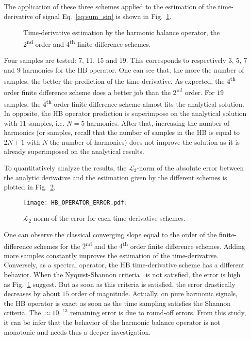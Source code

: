 The application of these three schemes applied 
to the estimation of the time-derivative of signal Eq.~\eqref{eq:sum_sin}
is shown
in Fig.~\ref{fig:hb_operator_sample}.
\begin{figure}[htbp]
  \centering
  \caption{Time-derivative estimation by the harmonic balance operator,
  the 2\textsuperscript{nd} order and 4\textsuperscript{th} finite difference schemes.}
  \label{fig:hb_operator_sample}
\end{figure}
Four samples
are tested: $7$, $11$, $15$ and $19$. This corresponds
to respectively $3$, $5$, $7$ and $9$ harmonics
for the HB operator. One can see that, the more the number
of samples, the better the prediction of the time-derivative.
As expected, the 4\textsuperscript{th} order finite difference
scheme does a better job than the 2\textsuperscript{nd} order.
For $19$ samples, the 4\textsuperscript{th} order finite difference
scheme almost fits the analytical solution. In opposite,
the HB operator prediction is superimpose on the analytical solution
with $11$ samples, i.e. $N=5$ harmonics. After that, increasing the
number of harmonics (or samples, recall that the number of samples
in the HB is equal to $2N+1$ with $N$ the number of harmonics)
does not improve the solution as it is already superimposed on
the analytical results.

To quantitatively analyze the results, the 
$\mathcal{L}_2$-norm of the absolute error between the analytic
derivative and the estimation given by the different schemes
is plotted in Fig.~\ref{fig:hb_operator_error}.
\begin{figure}[htb]
  \centering
   \texttt{[image: HB\_OPERATOR\_ERROR.pdf]}
   \caption{$\mathcal{L}_2$-norm of the error for each time-derivative
   schemes.}
  \label{fig:hb_operator_error}
\end{figure}
One can observe the classical converging slope
equal to the order of the finite-difference schemes for the
$2$\textsuperscript{nd} and the $4$\textsuperscript{th}
order finite difference schemes. 
Adding more samples constantly improves the estimation of 
the time-derivative.
Conversely, as a spectral operator, the HB time-derivative scheme 
has a different behavior. When the Nyquist-Shannon 
criteria~\cite{nyquist28:_certain_topic_in_teleg_trans_theor,Shannon1949} is not
satisfied, the error is high as Fig.~\ref{fig:hb_operator_sample}
suggest. But as soon as this criteria is satisfied, the error
drastically decreases by about $15$ order of magnitude.
Actually, on pure
harmonic signals, the HB operator is exact as soon as the time
sampling satisfies the Shannon criteria. The $\approx 10^{-13}$
remaining error is due to round-off errors.
From this study, it can be infer that the behavior
of the harmonic balance operator is not monotonic
and needs thus a deeper investigation.